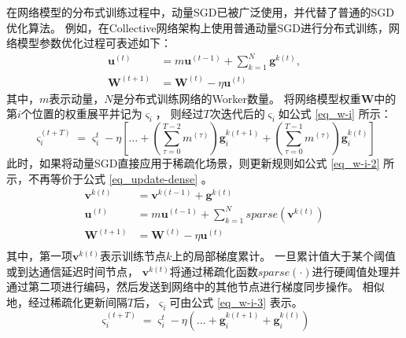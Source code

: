 \documentclass{xdupgthesis}
\begin{document}
在网络模型的分布式训练过程中，动量SGD已被广泛使用，并代替了普通的SGD优化算法。
例如，在Collective网络架构上使用普通动量SGD进行分布式训练，网络模型参数优化过程可表述如下\cite{qian1999momentum}：
\begin{equation}
    \begin{aligned}
        \mathbf{u}^{(t)} &= m\mathbf{u}^{(t-1)} + \sum_{k = 1}^{N}\mathbf{g}^{k(t)}, \\
        \mathbf{W}^{(t+1)} &= \mathbf{W}^{(t)} - \eta\mathbf{u}^{(t)}
    \label{eq_update-dense}
    \end{aligned}
\end{equation}
其中，$m$表示动量，$N$是分布式训练网络的Worker数量。
将网络模型权重$\mathbf{W}$中的第$i$个位置的权重展平并记为$\varsigma_{i}$，
则经过$T$次迭代后的$\varsigma_{i}$如公式 \eqref{eq_w-i} 所示：
\begin{equation}
    \varsigma_{i}^{(t+T)} = 
        \varsigma_{i}^{t} - \eta\left[
            \dots +
            \left( \sum_{\tau = 0}^{T - 2} m^{(\tau)} \right) \mathbf{g}_{i}^{k(t + 1)} +
            \left( \sum_{\tau = 0}^{T - 1} m^{(\tau)} \right) \mathbf{g}_{i}^{k(t)}
        \right]
    \label{eq_w-i}
\end{equation}
此时，如果将动量SGD直接应用于稀疏化场景，则更新规则如公式 \eqref{eq_w-i-2} 所示，不再等价于公式 \eqref{eq_update-dense} 。
\begin{equation}
    \begin{aligned}
        \mathbf{v}^{k(t)} &= \mathbf{v}^{k(t-1)} + \mathbf{g}^{k(t)} \\
        \mathbf{u}^{(t)} &= m\mathbf{u}^{(t - 1)} + \sum_{k = 1}^{N} sparse\left(\mathbf{v}^{k(t)}\right) \\
        \mathbf{W}^{(t+1)} &= \mathbf{W}^{(t)} - \eta\mathbf{u}^{(t)} \\
    \end{aligned}
    \label{eq_w-i-2}
\end{equation}
其中，第一项$\mathbf{v}^{k(t)}$表示训练节点$k$上的局部梯度累计。
一旦累计值大于某个阈值或到达通信延迟时间节点，
$\mathbf{v}^{k(t)}$将通过稀疏化函数$sparse\left(\cdot\right)$进行硬阈值处理并通过第二项进行编码，然后发送到网络中的其他节点进行梯度同步操作。
相似地，经过稀疏化更新间隔$T$后，$\varsigma_{i}$可由公式 \eqref{eq_w-i-3} 表示。
\begin{equation}
    \varsigma_{i}^{(t+T)} = 
        \varsigma_{i}^{t} - \eta\left(
            \dots + \mathbf{g}^{k(t+1)}_{i} + \mathbf{g}^{k(t)}_{i}
        \right)
    \label{eq_w-i-3}
\end{equation}
\end{document}

